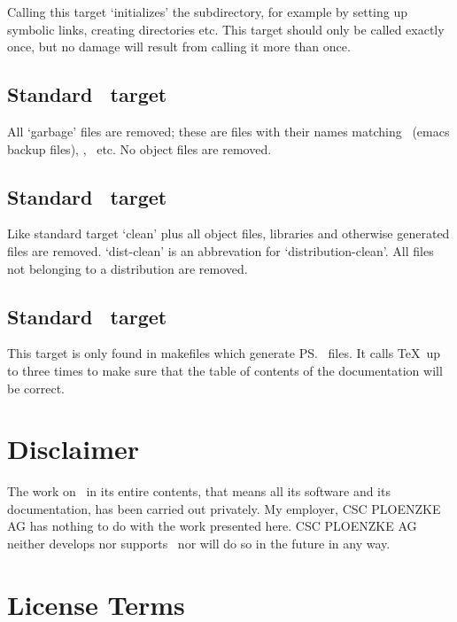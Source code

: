 Calling this target `initializes' the subdirectory, for example by
setting up symbolic links, creating directories etc. This target
should only be called exactly once, but no damage will result from
calling it more than once.

\subsection*{Standard \protect{}\ target \protect{}}

All `garbage' files are removed; these are files with their names
matching \lisp{*\td}\ (emacs backup files), , \
etc. No object files are removed.

\subsection*{Standard \protect{}\ target \protect{}}

Like standard target `clean' plus all object files, libraries and
otherwise generated files are removed. `dist-clean' is an abbrevation
for `distribution-clean'. All files not belonging to a distribution
are removed.

\subsection*{Standard \protect{}\ target \protect{}}

This target is only found in makefiles which generate \ps\ files.
It calls \TeX\ up to three times to make sure that the table of
contents of the documentation will be correct.

\section{Disclaimer}

The work on \plob\ in its entire contents, that means all its software
and its documentation, has been carried out privately. My employer,
CSC PLOENZKE AG has nothing to do with the work presented here. CSC
PLOENZKE AG neither develops nor supports \plob\ nor will do so in the
future in any way.

{\section{License Terms}}%
\label{sec:LicenseTerms}

